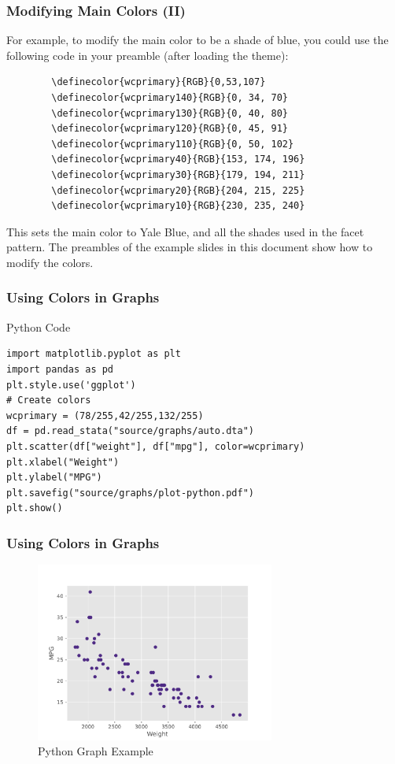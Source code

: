 \documentclass[aspectratio=1610]{beamer}
\begin{document}
\begin{frame}[fragile]
    \frametitle{Modifying Main Colors (II)}
    For example, to modify the main color to be a shade of blue, you could use the following code in your preamble (after loading the theme):
    \begin{verbatim}
        \definecolor{wcprimary}{RGB}{0,53,107}
        \definecolor{wcprimary140}{RGB}{0, 34, 70}
        \definecolor{wcprimary130}{RGB}{0, 40, 80}
        \definecolor{wcprimary120}{RGB}{0, 45, 91}
        \definecolor{wcprimary110}{RGB}{0, 50, 102}
        \definecolor{wcprimary40}{RGB}{153, 174, 196}
        \definecolor{wcprimary30}{RGB}{179, 194, 211}
        \definecolor{wcprimary20}{RGB}{204, 215, 225}
        \definecolor{wcprimary10}{RGB}{230, 235, 240}
    \end{verbatim}
    This sets the main color to Yale Blue, and all the shades used in the facet pattern. The preambles of the example slides in this document show how to modify the colors.
\end{frame}

\begin{frame}[fragile]
    \frametitle{Using Colors in Graphs}
    \begin{tblock}{Python Code}
        \footnotesize
        \begin{verbatim}
import matplotlib.pyplot as plt
import pandas as pd
plt.style.use('ggplot')
# Create colors
wcprimary = (78/255,42/255,132/255)
df = pd.read_stata("source/graphs/auto.dta")
plt.scatter(df["weight"], df["mpg"], color=wcprimary)
plt.xlabel("Weight")
plt.ylabel("MPG")
plt.savefig("source/graphs/plot-python.pdf")
plt.show()
        \end{verbatim}
    \end{tblock}
\end{frame}

\begin{frame}[fragile]
    \frametitle{Using Colors in Graphs}
    \begin{figure}
        \centering
        \includegraphics[width=0.7\textwidth]{graphs/plot-python.pdf}
        \caption{Python Graph Example}
        \label{fig:graph-python}
    \end{figure}
\end{frame}
\end{document}
